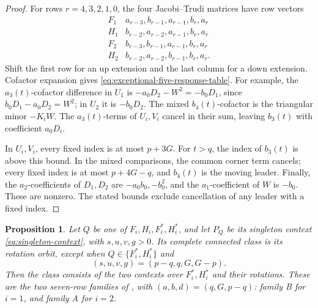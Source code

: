 \documentclass[11pt,a4paper]{amsart}
\numberwithin{equation}{section}
\theoremstyle{plain}
\newtheorem{proposition}[theorem]{Proposition}
\theoremstyle{definition}
\begin{document}
\begin{proof}
For rows \(r=4,3,2,1,0\), the four Jacobi--Trudi matrices have row
vectors
\begin{equation}\label{eq:exceptional-five-matrices}
 \begin{array}{c|l}
 F_1&a_{r-3},b_{r-1},a_{r-1},b_r,a_r\\
 H_1&b_{r-2},a_{r-2},a_{r-1},b_r,a_r\\
 F_2&b_{r-3},b_{r-1},a_{r-1},b_r,a_r\\
 H_2&b_{r-2},a_{r-2},b_{r-1},b_r,a_r.
 \end{array}
\end{equation}
Shift the first row for an up extension and the last column for a down
extension.  Cofactor expansion gives \eqref{eq:exceptional-five-response-table}.
For example, the \(a_3(t)\)-cofactor difference in \(U_1\) is
\(-a_0D_2-W^2=-b_0D_1\), since
\(b_0D_1-a_0D_2=W^2\); in \(U_2\) it is \(-b_0D_2\).
The mixed \(b_4(t)\)-cofactor is the triangular minor \(-K_iW\).
The \(a_3(t)\)-terms of \(U_i,V_i\) cancel in their sum, leaving
\(b_3(t)\) with coefficient \(a_0D_i\).

In \(U_i,V_i\), every fixed index is at most \(p+3G\).
For \(t>q\), the index of \(b_3(t)\) is above this bound.
In the mixed comparisons, the common corner term cancels; every fixed
index is at most \(p+4G-q\), and \(b_4(t)\) is the moving leader.
Finally, the \(a_2\)-coefficients of \(D_1,D_2\) are
\(-a_0b_0,-b_0^2\), and the \(a_1\)-coefficient of \(W\) is
\(-b_0\).  These are nonzero.  The stated bounds exclude cancellation
of any leader with a fixed index.
\end{proof}

\begin{proposition}\label{prop:exceptional-singleton-context}
Let \(Q\) be one of \(F_i,H_i,F_i^*,H_i^*\), and let \(P_Q\) be
its singleton context \eqref{eq:singleton-context}, with
\(s,u,v,g>0\).  Its complete connected class is its rotation orbit,
except when \(Q\in\{F_i^*,H_i^*\}\) and
\begin{equation}\label{eq:exceptional-singleton-locus}
 (s,u,v,g)=(p-q,q,G,G-p).
\end{equation}
Then the class consists of the two contexts over \(F_i^*,H_i^*\) and
their rotations.  These are the two seven-row families of
, with \((a,b,d)=(q,G,p-q)\):
family B for \(i=1\), and family A for \(i=2\).
\end{proposition}
\end{document}
